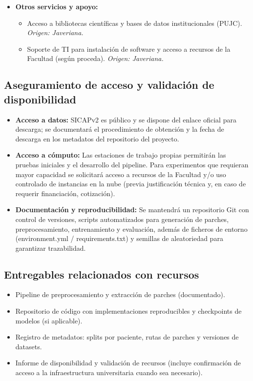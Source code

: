 \begin{itemize}
    \item \textbf{Otros servicios y apoyo:}
    \begin{itemize}
        \item Acceso a bibliotecas científicas y bases de datos institucionales (PUJC). \textit{Origen: Javeriana.}
        \item Soporte de TI para instalación de software y acceso a recursos de la Facultad (según proceda). \textit{Origen: Javeriana.}
    \end{itemize}
\end{itemize}

\subsection{Aseguramiento de acceso y validación de disponibilidad}
\begin{itemize}
    \item \textbf{Acceso a datos:} SICAPv2 es público y se dispone del enlace oficial para descarga; se documentará el procedimiento de obtención y la fecha de descarga en los metadatos del repositorio del proyecto.
    \item \textbf{Acceso a cómputo:} Las estaciones de trabajo propias permitirán las pruebas iniciales y el desarrollo del pipeline. Para experimentos que requieran mayor capacidad se solicitará acceso a recursos de la Facultad y/o uso controlado de instancias en la nube (previa justificación técnica y, en caso de requerir financiación, cotización).
    \item \textbf{Documentación y reproducibilidad:} Se mantendrá un repositorio Git con control de versiones, scripts automatizados para generación de parches, preprocesamiento, entrenamiento y evaluación, además de ficheros de entorno (environment.yml / requirements.txt) y semillas de aleatoriedad para garantizar trazabilidad.
\end{itemize}

\subsection{Entregables relacionados con recursos}
\begin{itemize}
    \item Pipeline de preprocesamiento y extracción de parches (documentado).
    \item Repositorio de código con implementaciones reproducibles y checkpoints de modelos (si aplicable).
    \item Registro de metadatos: splits por paciente, rutas de parches y versiones de datasets.
    \item Informe de disponibilidad y validación de recursos (incluye confirmación de acceso a la infraestructura universitaria cuando sea necesario).
\end{itemize}



